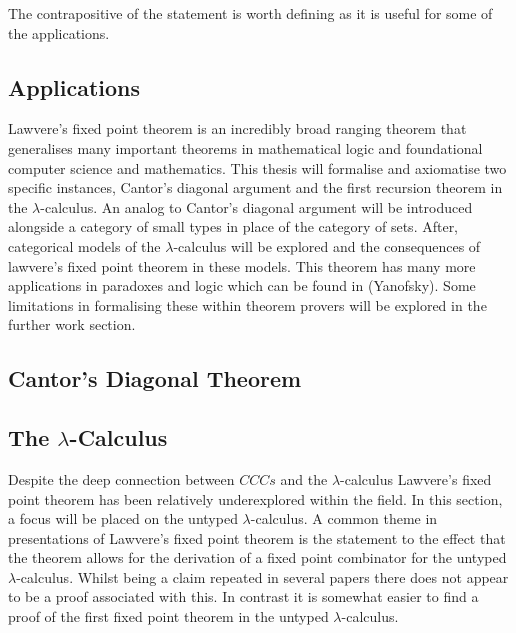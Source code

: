 The contrapositive of the statement is worth defining as it is useful for some
of the applications.

\subsection{Applications}

Lawvere's fixed point theorem is an incredibly broad ranging theorem that
generalises many important theorems in mathematical logic and foundational
computer science and mathematics. This thesis will formalise and axiomatise two
specific instances, Cantor's diagonal argument and the first recursion theorem
in the $\lambda$-calculus. An analog to Cantor's diagonal argument will be introduced
alongside a category of small types in place of the category of sets.
After, categorical models of the $\lambda$-calculus will be explored and the
consequences of lawvere's fixed point theorem in these models. This theorem has
many more applications in paradoxes and logic which can be found in (Yanofsky).
Some limitations in formalising these within theorem provers will be explored in
the further work section.
\subsection{Cantor's Diagonal Theorem}

\subsection{The $\lambda$-Calculus}

Despite the deep connection between $CCCs$ and the $\lambda$-calculus 
Lawvere's fixed point theorem has been relatively underexplored within the
field. In this section, a focus will be placed on the untyped
$\lambda$-calculus. A common theme in presentations of Lawvere's fixed point
theorem is the statement to the effect that the theorem allows for the
derivation of a fixed point combinator for the untyped $\lambda$-calculus.
Whilst being a claim repeated in several papers there does not appear to be a
proof associated with this. In contrast it is somewhat easier to find a proof
of the first fixed point theorem in the untyped $\lambda$-calculus. 

